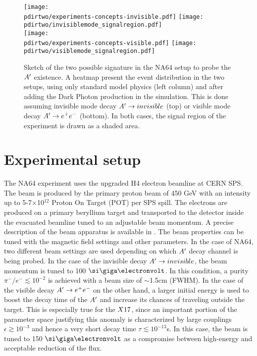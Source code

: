 \begin{figure}[bth!]
  \centering
  \texttt{[image: \\pdirtwo/experiments-concepts-invisible.pdf]}
  \texttt{[image: \\pdirtwo/invisiblemode\_signalregion.pdf]} \\
  \texttt{[image: \\pdirtwo/experiments-concepts-visible.pdf]}
  \texttt{[image: \\pdirtwo/visiblemode\_signalregion.pdf]}   
\caption[Sketch of experimental signatures for $\DM$]{Sketch of the two possible signature in the NA64 setup to probe the $\DM$ existence. A heatmap present the event distribution in the two setups, using only standard model physics (left column) and after adding the Dark Photon production in the simulation. This is done assuming invisible mode decay $A'\to invisible$ (top) or visible mode decay $A' \to e^+e^-$ (bottom). In both cases, the signal region of the experiment is drawn as a shaded area.}
\label{fig:two-signature}
\end{figure}

\clearpage
\newpage

\section{Experimental setup}
\label{ch2:sec:experimental-setup}

The NA64 experiment uses the upgraded H4 electron beamline at CERN SPS. The beam is produced by the primary proton beam of 450 \si{\giga\electronvolt} with an intensity up to 5-7$\times$10$^{12}$ Proton On Target (POT) per SPS spill. The electrons are produced on a primary beryllium target and transported to the detector inside the evacuated beamline tuned to an adjustable beam momentum. A precise description of the beam apparatus is available in \cite{sps-beamline,h4-beamline}. The beam properties can be tuned with the magnetic field settings and other parameters. In the case of NA64, two different beam settings are used depending on which $\DM$ decay channel is being probed. In the case of the invisible decay $A'\to invisible$, the beam momentum is tuned to 100 $\gev$. In this condition, a purity $\pi^-/e^- \lesssim 10^{-2}$ is achieved with a beam size of $\sim$1.5\si{cm} (FWHM). In the case of the visible decay $A' \to e^+e^-$ on the other hand, a larger initial energy is used to boost the decay time of the $\DM$ and increase its chances of traveling outside the target. This is especially true for the $X17$, since an important portion of the parameter space justifying this anomaly is characterized by large couplings $\epsilon \gtrsim 10^{-3}$ and hence a very short decay time $\tau \lesssim 10^{-13}$\si{s}. In this case, the beam is tuned to 150 $\gev$ as a compromise between high-energy and acceptable reduction of the flux.

